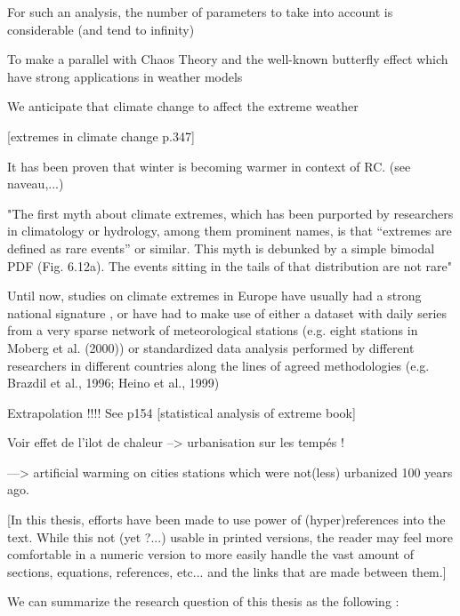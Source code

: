 \documentclass[11pt,a4paper,openany, twosided]{book}
\begin{document}
For such an analysis, the number of parameters to take into account is considerable (and tend to infinity)  

To make a parallel with Chaos Theory and the well-known butterfly effect which have strong applications in weather models\newline

We anticipate that climate change to affect the extreme weather  \newline

[extremes in climate change p.347]


It has been proven that winter is becoming warmer in context of RC. (see naveau,...)


\cite{kharin_changes_2006}


"The first myth about climate extremes, which has been purported by
researchers in climatology or hydrology, among them prominent names, is that
“extremes are defined as rare events” or similar. This myth is debunked by a simple
bimodal PDF (Fig. 6.12a). The events sitting in the tails of that distribution are not
rare" \cite[pp.257]{mudelsee_climate_2014}
\newline

Until now, studies on climate extremes in Europe have usually had a strong national signature
, or have had to make use of either a
dataset with daily series from a very sparse network of meteorological stations (e.g. eight stations in Moberg
et al. (2000)) or standardized data analysis performed by different researchers in different countries along the
lines of agreed methodologies (e.g. Brazdil et al., 1996; Heino et al., 1999) \cite{klein_tank_daily_2002}


Extrapolation !!!! See p154 [statistical analysis of extreme book]



Voir effet de l'ilot de chaleur --> urbanisation sur les tempés !

---> artificial warming on cities stations which were not(less) urbanized 100 years ago.

[In this thesis, efforts have been made to use power of (hyper)references into the 
text. While this not (yet ?...) usable in printed versions, the reader may feel more 
comfortable in a numeric version to more easily handle the vast amount of sections, 
equations, references, etc... and the links that are made between them.]


We can summarize the research question of this thesis as the following : 
\end{document}
